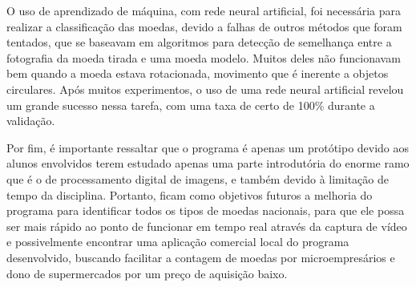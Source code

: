 \documentclass[10pt,journal,compsoc]{IEEEtran}
\begin{document}
O uso de aprendizado de máquina, com rede neural artificial, foi necessária para realizar a classificação das moedas, devido a falhas de outros métodos que foram tentados, que se baseavam em algoritmos para detecção de semelhança entre a fotografia da moeda tirada e uma moeda modelo. Muitos deles não funcionavam bem quando a moeda estava rotacionada, movimento que é inerente a objetos circulares.
Após muitos experimentos, o uso de uma rede neural artificial revelou um grande sucesso nessa tarefa, com uma taxa de certo de 100\% durante a validação.

Por fim, é importante ressaltar que o programa é apenas um protótipo devido aos alunos envolvidos terem estudado apenas uma parte introdutória do enorme ramo que é o de processamento digital de imagens, e também devido à limitação de tempo da disciplina. Portanto, ficam como objetivos futuros a melhoria do programa para identificar todos os tipos de moedas nacionais, para que ele possa ser mais rápido ao ponto de funcionar em tempo real através da captura de vídeo e possivelmente encontrar uma aplicação comercial local do programa desenvolvido, buscando facilitar a contagem de moedas por microempresários e dono de supermercados por um preço de aquisição baixo.  

\medskip



\end{document}
